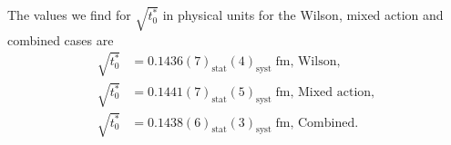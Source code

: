 The values we find for $\sqrt{t_0^*}$ in physical units for the Wilson, mixed action and combined cases are
\begin{align}
\label{ch_ss:eq:t0*}
\sqrt{t_0^*}&=0.1436(7)_{\textrm{stat}}(4)_{\textrm{syst}}\;\textrm{fm, Wilson}, \\
\sqrt{t_0^*}&=0.1441(7)_{\textrm{stat}}(5)_{\textrm{syst}}\;\textrm{fm, Mixed action}, \\
\sqrt{t_0^*}&=0.1438(6)_{\textrm{stat}}(3)_{\textrm{syst}}\;\textrm{fm, Combined}.
\end{align}

